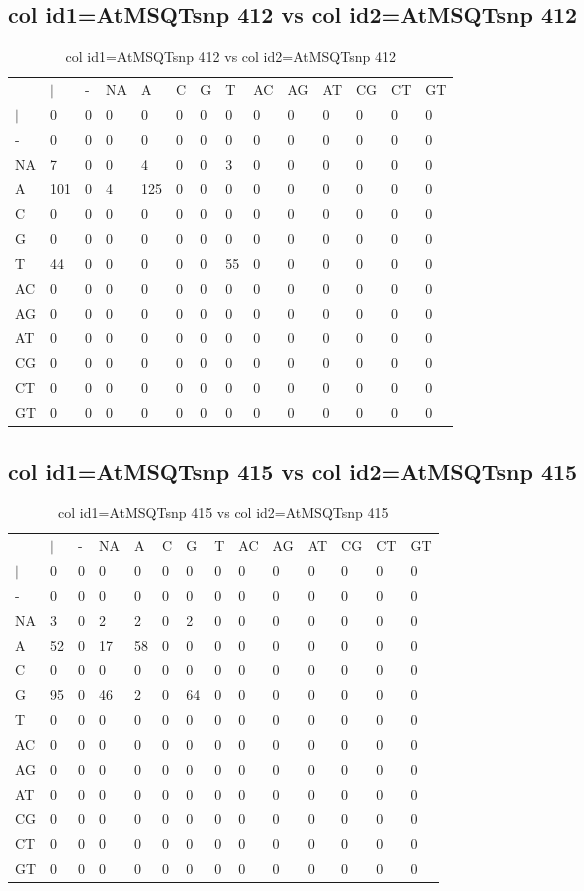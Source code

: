 \subsection{col id1=AtMSQTsnp 412 vs col id2=AtMSQTsnp 412}
\begin{center}
\begin{longtable}{|l|l|l|l|l|l|l|l|l|l|l|l|l|l|}
\caption{col id1=AtMSQTsnp 412 vs col id2=AtMSQTsnp 412} \label{table_dm932}\\
\hline
\\
\hline
&$|$&-&NA&A&C&G&T&AC&AG&AT&CG&CT&GT\\
$|$&0&0&0&0&0&0&0&0&0&0&0&0&0\\
-&0&0&0&0&0&0&0&0&0&0&0&0&0\\
NA&7&0&0&4&0&0&3&0&0&0&0&0&0\\
A&101&0&4&125&0&0&0&0&0&0&0&0&0\\
C&0&0&0&0&0&0&0&0&0&0&0&0&0\\
G&0&0&0&0&0&0&0&0&0&0&0&0&0\\
T&44&0&0&0&0&0&55&0&0&0&0&0&0\\
AC&0&0&0&0&0&0&0&0&0&0&0&0&0\\
AG&0&0&0&0&0&0&0&0&0&0&0&0&0\\
AT&0&0&0&0&0&0&0&0&0&0&0&0&0\\
CG&0&0&0&0&0&0&0&0&0&0&0&0&0\\
CT&0&0&0&0&0&0&0&0&0&0&0&0&0\\
GT&0&0&0&0&0&0&0&0&0&0&0&0&0\\
\hline
\end{longtable}
\end{center}

\subsection{col id1=AtMSQTsnp 415 vs col id2=AtMSQTsnp 415}
\begin{center}
\begin{longtable}{|l|l|l|l|l|l|l|l|l|l|l|l|l|l|}
\caption{col id1=AtMSQTsnp 415 vs col id2=AtMSQTsnp 415} \label{table_dm934}\\
\hline
\\
\hline
&$|$&-&NA&A&C&G&T&AC&AG&AT&CG&CT&GT\\
$|$&0&0&0&0&0&0&0&0&0&0&0&0&0\\
-&0&0&0&0&0&0&0&0&0&0&0&0&0\\
NA&3&0&2&2&0&2&0&0&0&0&0&0&0\\
A&52&0&17&58&0&0&0&0&0&0&0&0&0\\
C&0&0&0&0&0&0&0&0&0&0&0&0&0\\
G&95&0&46&2&0&64&0&0&0&0&0&0&0\\
T&0&0&0&0&0&0&0&0&0&0&0&0&0\\
AC&0&0&0&0&0&0&0&0&0&0&0&0&0\\
AG&0&0&0&0&0&0&0&0&0&0&0&0&0\\
AT&0&0&0&0&0&0&0&0&0&0&0&0&0\\
CG&0&0&0&0&0&0&0&0&0&0&0&0&0\\
CT&0&0&0&0&0&0&0&0&0&0&0&0&0\\
GT&0&0&0&0&0&0&0&0&0&0&0&0&0\\
\hline
\end{longtable}
\end{center}

